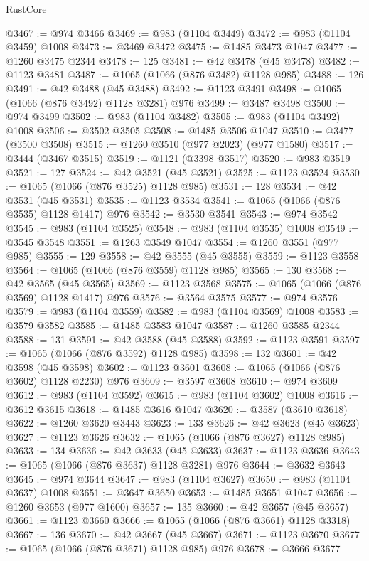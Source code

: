 \begin{lexlean}{RustCore}
\begin{coremodule}
@3467 := @974 @3466
@3469 := @983 (@1104 @3449)
@3472 := @983 (@1104 @3459) @1008
@3473 := @3469 @3472
@3475 := @1485 @3473 @1047
@3477 := @1260 @3475 @2344
@3478 := 125
@3481 := @42 @3478 (@45 @3478)
@3482 := @1123 @3481
@3487 := @1065 (@1066 (@876 @3482) @1128 @985)
@3488 := 126
@3491 := @42 @3488 (@45 @3488)
@3492 := @1123 @3491
@3498 := @1065 (@1066 (@876 @3492) @1128 @3281) @976
@3499 := @3487 @3498
@3500 := @974 @3499
@3502 := @983 (@1104 @3482)
@3505 := @983 (@1104 @3492) @1008
@3506 := @3502 @3505
@3508 := @1485 @3506 @1047
@3510 := @3477 (@3500 @3508)
@3515 := @1260 @3510 (@977 @2023) (@977 @1580)
@3517 := @3444 (@3467 @3515)
@3519 := @1121 (@3398 @3517)
@3520 := @983 @3519
@3521 := 127
@3524 := @42 @3521 (@45 @3521)
@3525 := @1123 @3524
@3530 := @1065 (@1066 (@876 @3525) @1128 @985)
@3531 := 128
@3534 := @42 @3531 (@45 @3531)
@3535 := @1123 @3534
@3541 := @1065 (@1066 (@876 @3535) @1128 @1417) @976
@3542 := @3530 @3541
@3543 := @974 @3542
@3545 := @983 (@1104 @3525)
@3548 := @983 (@1104 @3535) @1008
@3549 := @3545 @3548
@3551 := @1263 @3549 @1047
@3554 := @1260 @3551 (@977 @985)
@3555 := 129
@3558 := @42 @3555 (@45 @3555)
@3559 := @1123 @3558
@3564 := @1065 (@1066 (@876 @3559) @1128 @985)
@3565 := 130
@3568 := @42 @3565 (@45 @3565)
@3569 := @1123 @3568
@3575 := @1065 (@1066 (@876 @3569) @1128 @1417) @976
@3576 := @3564 @3575
@3577 := @974 @3576
@3579 := @983 (@1104 @3559)
@3582 := @983 (@1104 @3569) @1008
@3583 := @3579 @3582
@3585 := @1485 @3583 @1047
@3587 := @1260 @3585 @2344
@3588 := 131
@3591 := @42 @3588 (@45 @3588)
@3592 := @1123 @3591
@3597 := @1065 (@1066 (@876 @3592) @1128 @985)
@3598 := 132
@3601 := @42 @3598 (@45 @3598)
@3602 := @1123 @3601
@3608 := @1065 (@1066 (@876 @3602) @1128 @2230) @976
@3609 := @3597 @3608
@3610 := @974 @3609
@3612 := @983 (@1104 @3592)
@3615 := @983 (@1104 @3602) @1008
@3616 := @3612 @3615
@3618 := @1485 @3616 @1047
@3620 := @3587 (@3610 @3618)
@3622 := @1260 @3620 @3443
@3623 := 133
@3626 := @42 @3623 (@45 @3623)
@3627 := @1123 @3626
@3632 := @1065 (@1066 (@876 @3627) @1128 @985)
@3633 := 134
@3636 := @42 @3633 (@45 @3633)
@3637 := @1123 @3636
@3643 := @1065 (@1066 (@876 @3637) @1128 @3281) @976
@3644 := @3632 @3643
@3645 := @974 @3644
@3647 := @983 (@1104 @3627)
@3650 := @983 (@1104 @3637) @1008
@3651 := @3647 @3650
@3653 := @1485 @3651 @1047
@3656 := @1260 @3653 (@977 @1600)
@3657 := 135
@3660 := @42 @3657 (@45 @3657)
@3661 := @1123 @3660
@3666 := @1065 (@1066 (@876 @3661) @1128 @3318)
@3667 := 136
@3670 := @42 @3667 (@45 @3667)
@3671 := @1123 @3670
@3677 := @1065 (@1066 (@876 @3671) @1128 @985) @976
@3678 := @3666 @3677

\end{coremodule}
\end{lexlean}
